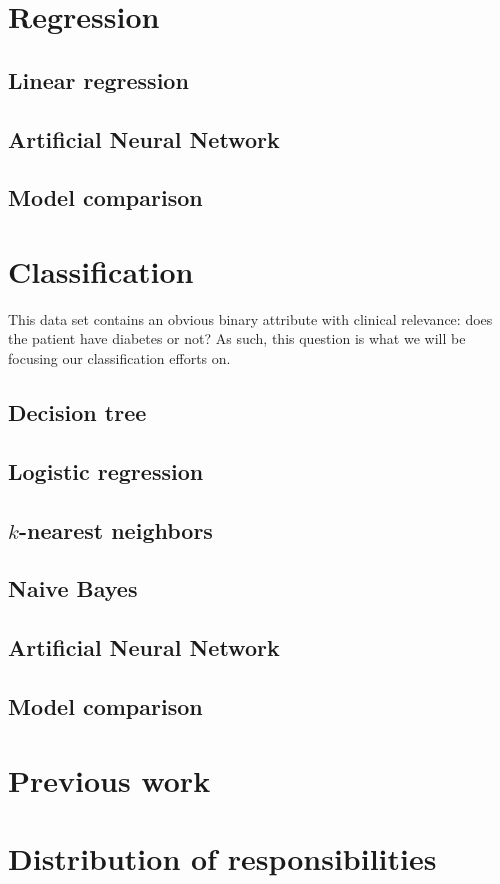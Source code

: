 \section{Regression}

\subsection{Linear regression}

\subsection{Artificial Neural Network}

\subsection{Model comparison}


\section{Classification}

This data set contains an obvious binary attribute
with clinical relevance:
does the patient have diabetes or not?
As such, this question is what we will be
focusing our classification efforts on.

\subsection{Decision tree}

\subsection{Logistic regression}

\subsection{$k$-nearest neighbors}

\subsection{Naive Bayes}

\subsection{Artificial Neural Network}

\subsection{Model comparison}

\section{Previous work}

\appendix
\section{Distribution of responsibilities}